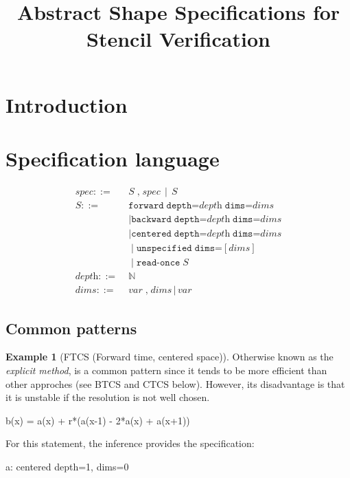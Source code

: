 \documentclass[10pt]{sigplanconf}
\title{Abstract Shape Specifications for Stencil Verification}
\newcounter{block}
\theoremstyle{definition}
\newtheorem{example}[block]{Example}
\begin{document}
\maketitle

\begin{abstract}
\end{abstract}



\section{Introduction}


\section{Specification language}

\begin{align*}
spec ::= & \; S  \; \texttt{,} \; spec \, \mid \, S \\[0.5em]
%
S ::= &  \; \texttt{forward} \; \texttt{depth=}\textit{depth} \; \texttt{dims=}\textit{dims} \\
& \; \mid \texttt{backward} \; \texttt{depth=}\textit{depth} \; \texttt{dims=}\textit{dims} \\
& \; \mid \texttt{centered} \; \texttt{depth=}\textit{depth} \; \texttt{dims=}\textit{dims} \\
& \; \mid \texttt{unspecified} \; \texttt{dims=}[\textit{dims}] \\
& \; \mid \texttt{read-once} \; S \\[0.5em]
\textit{depth} ::= & \; \mathbb{N} \\
\textit{dims}  ::= & \; \textit{var} \; \texttt{,} \; \textit{dims} \,
                      \mid \, \textit{var}
\end{align*}

\subsection{Common patterns}

\begin{example}[FTCS (Forward time, centered space)]

  Otherwise known as the \emph{explicit method}, is a common
  pattern since it tends to be more efficient than other approches
  (see BTCS and CTCS below). However, its disadvantage is that it is
  unstable if the resolution is not well chosen. 

\begin{ExmVerbatim}
b(x) = a(x) + r*(a(x-1) - 2*a(x) + a(x+1))
\end{ExmVerbatim}
%
For this statement, the inference provides the specification: 
%
\begin{SpecVerbatim}
a: centered depth=1, dims=0
\end{SpecVerbatim}

\end{example}
\end{document}
